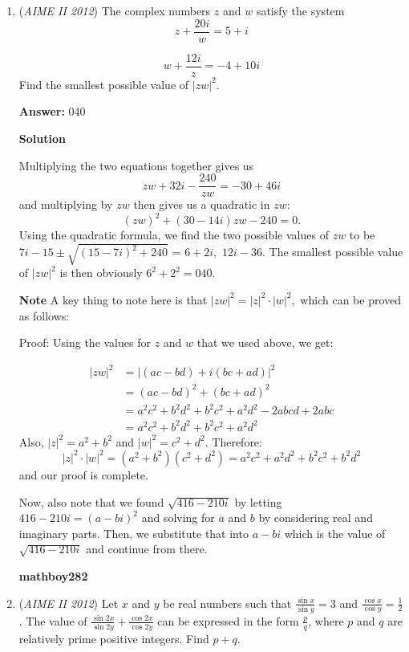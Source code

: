\begin{enumerate}
 


 \href{https://mathproblemsolvingskills.wordpress.com/}{Math Problem Solving Skills}

 


	\item (\textit{AIME II 2012}) The complex numbers $z$ and $w$ satisfy the system 
 \[z + \frac{20i}w = 5+i\]

 \[w+\frac{12i}z = -4+10i\] Find the smallest possible value of $\vert zw\vert^2$.


 
 \textbf{Answer: }040



\textbf{Solution}

Multiplying the two equations together gives us 
 \[zw + 32i - \frac{240}{zw} = -30 + 46i\] and multiplying by $zw$ then gives us a quadratic in $zw$: 
 \[(zw)^2 + (30-14i)zw - 240 =0.\] Using the quadratic formula, we find the two possible values of $zw$ to be $7i-15 \pm \sqrt{(15-7i)^2 + 240}$ = $6+2i,$ $12i - 36.$ The smallest possible value of $\vert zw\vert^2$ is then obviously $6^2 + 2^2 = \boxed{040}$.

 \textbf{Note} A key thing to note here is that $|zw|^2=|z|^2\cdot|w|^2,$ which can be proved as follows:

 Proof: Using the values for $z$ and $w$ that we used above, we get:

 \begin{align*}|zw|^2&=|(ac-bd)+i(bc+ad)|^2\\&=(ac-bd)^2+(bc+ad)^2\\&=a^2c^2+b^2d^2+b^2c^2+a^2d^2-2abcd+2abc\\&=a^2c^2+b^2d^2+b^2c^2+a^2d^2\end{align*}
Also, $|z|^2=a^2+b^2$ and $|w|^2=c^2+d^2$. Therefore: 
 \[|z|^2\cdot|w|^2=(a^2+b^2)(c^2+d^2)=a^2c^2+a^2d^2+b^2c^2+b^2d^2\]and our proof is complete.

 Now, also note that we found $\sqrt{416-210i}$ by letting $416-210i=(a-bi)^2$ and solving for $a$ and $b$ by considering real and imaginary parts. Then, we substitute that into $a-bi$ which is the value of $\sqrt{416-210i}$ and continue from there.

 \textbf{mathboy282}

 


	\item (\textit{AIME II 2012}) Let $x$ and $y$ be real numbers such that $\frac{\sin x}{\sin y} = 3$ and $\frac{\cos x}{\cos y} = \frac12$. The value of $\frac{\sin 2x}{\sin 2y} + \frac{\cos 2x}{\cos 2y}$ can be expressed in the form $\frac pq$, where $p$ and $q$ are relatively prime positive integers. Find $p+q$.



\end{enumerate}
